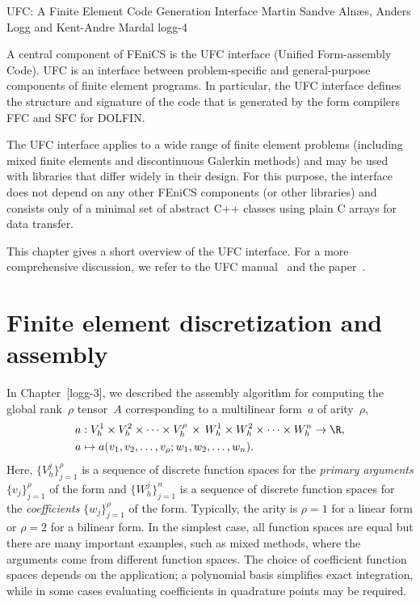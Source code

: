               {UFC: A Finite Element Code Generation Interface}
              {Martin Sandve Aln\ae{}s, Anders Logg and Kent-Andre Mardal}
              {logg-4}

A central component of FEniCS is the UFC interface (Unified
Form-assembly Code). UFC is an interface between problem-specific and
general-purpose components of finite element programs. In particular,
the UFC interface defines the structure and signature of the code that
is generated by the form compilers FFC and SFC for DOLFIN.

The UFC interface applies to a wide range of finite element problems
(including mixed finite elements and discontinuous Galerkin methods)
and may be used with libraries that differ widely in their design. For
this purpose, the interface does not depend on any other FEniCS
components (or other libraries) and consists only of a minimal set of
abstract C++ classes using plain C arrays for data transfer.

This chapter gives a short overview of the UFC interface. For a more
comprehensive discussion, we refer to the UFC
manual~\cite{AlnaesLangtangenEtAl2007} and the
paper~\cite{AlnaesLoggEtAl2009a}.

\section{Finite element discretization and assembly}
\label{sec:fem}

In Chapter~[logg-3], we described the assembly algorithm for computing
the global rank~$\rho$ tensor~$A$ corresponding to a multilinear
form~$a$ of arity~$\rho$,
\begin{equation} \label{eq:varform}
  \begin{split}
    a &: V_h^1 \times V_h^2 \times \cdots \times V_h^{\rho} \, \times \,
         W_h^1 \times W_h^2 \times \cdots \times W_h^n \rightarrow \R, \\
    a &\mapsto a(v_1, v_2, \ldots, v_{\rho}; w_1, w_2, \ldots, w_n).
  \end{split}
\end{equation}
Here, $\{V_h^j\}_{j=1}^{\rho}$ is a sequence of discrete function
spaces for the \emph{primary arguments} $\{v_j\}_{j=1}^{\rho}$ of the
form and $\{W_h^j\}_{j=1}^n$ is a sequence of discrete function spaces
for the \emph{coefficients} $\{w_j\}_{j=1}^{\rho}$ of the
form. Typically, the arity is $\rho=1$ for a linear form or $\rho=2$
for a bilinear form. In the simplest case, all function spaces are
equal but there are many important examples, such as mixed methods,
where the arguments come from different function spaces. The choice of
coefficient function spaces depends on the application; a polynomial
basis simplifies exact integration, while in some cases evaluating
coefficients in quadrature points may be required.

